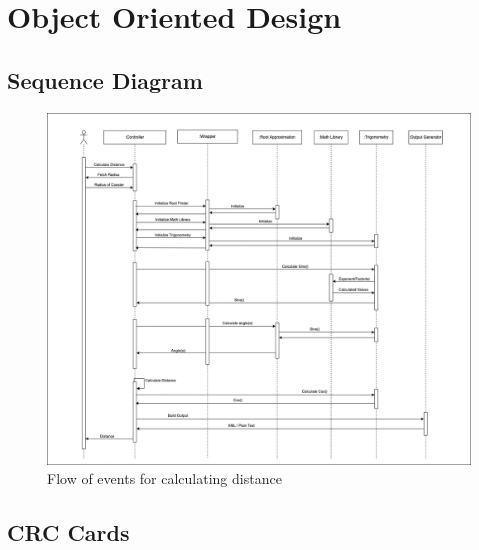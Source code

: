   \section{Object Oriented Design}
    \subsection{Sequence Diagram}
      \vspace{1cm}
      \begin{figure}[h!]
        \includegraphics[width=1\linewidth]{resources/cheers-sequence.png}
        \vspace{.5cm}
        \caption{Flow of events for calculating distance}
        \label{fig:Sequence Diagram}
      \end{figure}
      \pagebreak

  \subsection{CRC Cards}
